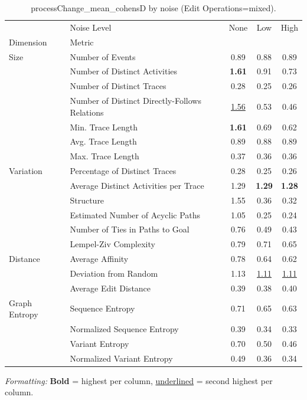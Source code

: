 \begin{table}[H]
\centering
\scriptsize
\caption{processChange_mean_cohensD by noise (Edit Operations=mixed).}
\label{tab:processchange-mean-cohensd-by-noise}
\setlength{\tabcolsep}{2pt}  %
\begin{tabular}{llccc}
\toprule
              & Noise Level &  None &  Low &  High \\
Dimension & Metric &       &      &       \\
\midrule
Size & Number of Events & 0.89 & 0.88 & 0.89 \\
              & Number of Distinct Activities & \textbf{1.61} & 0.91 & 0.73 \\
              & Number of Distinct Traces & 0.28 & 0.25 & 0.26 \\
              & Number of Distinct Directly-Follows Relations & \underline{1.56} & 0.53 & 0.46 \\
              & Min. Trace Length & \textbf{1.61} & 0.69 & 0.62 \\
              & Avg. Trace Length & 0.89 & 0.88 & 0.89 \\
              & Max. Trace Length & 0.37 & 0.36 & 0.36 \\
Variation & Percentage of Distinct Traces & 0.28 & 0.25 & 0.26 \\
              & Average Distinct Activities per Trace & 1.29 & \textbf{1.29} & \textbf{1.28} \\
              & Structure & 1.55 & 0.36 & 0.32 \\
              & Estimated Number of Acyclic Paths & 1.05 & 0.25 & 0.24 \\
              & Number of Ties in Paths to Goal & 0.76 & 0.49 & 0.43 \\
              & Lempel-Ziv Complexity & 0.79 & 0.71 & 0.65 \\
Distance & Average Affinity & 0.78 & 0.64 & 0.62 \\
              & Deviation from Random & 1.13 & \underline{1.11} & \underline{1.11} \\
              & Average Edit Distance & 0.39 & 0.38 & 0.40 \\
Graph Entropy & Sequence Entropy & 0.71 & 0.65 & 0.63 \\
              & Normalized Sequence Entropy & 0.39 & 0.34 & 0.33 \\
              & Variant Entropy & 0.70 & 0.50 & 0.46 \\
              & Normalized Variant Entropy & 0.49 & 0.36 & 0.34 \\
\bottomrule
\end{tabular}
\vspace{2pt}
\begin{minipage}{\linewidth}
\centering
\scriptsize
\tiny
\textit{Formatting:} \textbf{Bold} = highest per column, \underline{underlined} = second highest per column.
\end{minipage}
\end{table}
